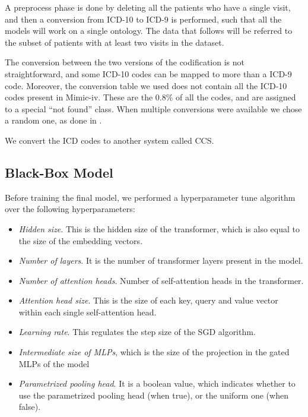 \documentclass[]{marticle}
\begin{document}
A preprocess phase is done by deleting all the patients who have a single visit, and then a
conversion from ICD-10 to ICD-9 is performed, such that all the models will work on a single
ontology. The data that follows will be referred to the subset of patients with at least two visits
in the dataset.

The conversion between the two versions of the codification is not straightforward, and some ICD-10
codes can be mapped to more than a ICD-9 code. Moreover, the conversion table we used 
does not contain all the ICD-10 codes present in Mimic-iv. These are the 0.8\% of all the codes, and
are assigned to a special ``not found'' class. When multiple conversions were available we chose a
random one, as done in \cite{setor-paper}.

We convert the ICD codes to another system called CCS. 

\subsection{Black-Box Model}

Before training the final model, we performed a hyperparameter tune algorithm over the following
hyperparameters:
\begin{itemize}
\item \textit{Hidden size}. This is the hidden size of the transformer, which is also equal to the
    size of the embedding vectors.

\item \textit{Number of layers}. It is the number of transformer layers present in the model.

\item \textit{Number of attention heads}. Number of self-attention heads in the transformer.

\item \textit{Attention head size}. This is the size of each key, query and value vector within each
    single self-attention head.

\item \textit{Learning rate}. This regulates the step size of the SGD algorithm.

\item \textit{Intermediate size of MLPs}, which is the size of the projection in the gated MLPs of
    the model

\item \textit{Parametrized pooling head}. It is a boolean value, which indicates whether to use the
    parametrized pooling head (when true), or the uniform one (when false).
\end{itemize}
\end{document}
